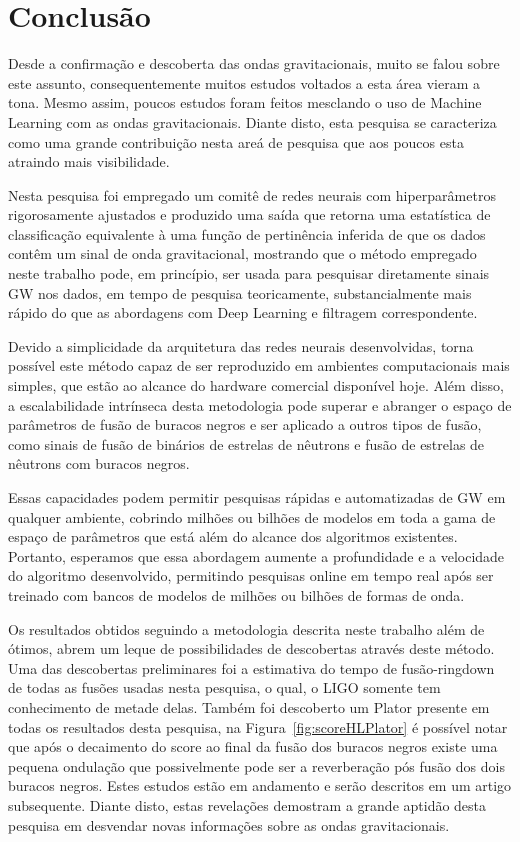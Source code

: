 \chapter{Conclusão}

Desde a confirmação e descoberta das ondas gravitacionais, muito se falou sobre este assunto, consequentemente muitos estudos voltados a esta área vieram a tona. Mesmo assim, poucos estudos foram feitos mesclando o uso de Machine Learning com as ondas gravitacionais. Diante disto, esta pesquisa se caracteriza como uma grande contribuição nesta areá de pesquisa que aos poucos esta atraindo mais visibilidade. 

Nesta pesquisa foi empregado um comitê de redes neurais com hiperparâmetros rigorosamente ajustados e produzido uma saída que retorna uma estatística de classificação equivalente à uma função de pertinência inferida de que os dados contêm um sinal de onda gravitacional, mostrando que o método empregado neste trabalho pode, em princípio, ser usada para pesquisar diretamente sinais GW nos dados, em tempo de pesquisa teoricamente, substancialmente mais rápido do que as abordagens com Deep Learning e filtragem correspondente.

Devido a simplicidade da arquitetura das redes neurais desenvolvidas, torna possível este método capaz de ser reproduzido em ambientes computacionais mais simples, que estão ao alcance do hardware comercial disponível hoje. Além disso, a escalabilidade intrínseca desta metodologia pode superar e abranger o espaço de parâmetros de fusão de buracos negros e ser aplicado a outros tipos de fusão, como sinais de fusão de binários de estrelas de nêutrons e fusão de estrelas de nêutrons com buracos negros. 

Essas capacidades podem permitir pesquisas rápidas e automatizadas de GW em qualquer ambiente, cobrindo milhões ou bilhões de modelos em toda a gama de espaço de parâmetros que está além do alcance dos algoritmos existentes. Portanto, esperamos que essa abordagem aumente a profundidade e a velocidade do algoritmo desenvolvido, permitindo pesquisas online em tempo real após ser treinado com bancos de modelos de milhões ou bilhões de formas de onda.

Os resultados obtidos seguindo a metodologia descrita neste trabalho além de ótimos, abrem um leque de possibilidades de descobertas através deste método. Uma das descobertas preliminares foi a estimativa do tempo de fusão-ringdown de todas as fusões usadas nesta pesquisa, o qual, o LIGO somente tem conhecimento de metade delas. Também foi descoberto um Plator presente em todas os resultados desta pesquisa, na Figura~\ref{fig:scoreHLPlator} é possível notar que após o decaimento do score ao final da fusão dos buracos negros existe uma pequena ondulação que possivelmente pode ser a reverberação pós fusão dos dois buracos negros. Estes estudos estão em andamento e serão descritos em um artigo subsequente. Diante disto, estas revelações demostram a grande aptidão desta pesquisa em desvendar novas informações sobre as ondas gravitacionais.

